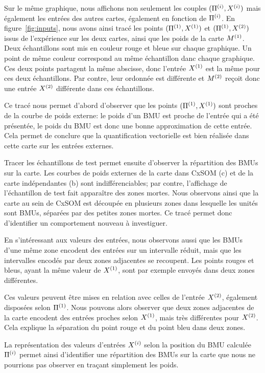 Sur le même graphique, nous affichons non seulement les couples $(\Pi^{({i})},X^{({i})})$ mais également les entrées des autres cartes, également en fonction de $\Pi^{({i})}$.
En figure~\ref{fig:inputs}, nous avons ainsi tracé les points $(\Pi^{({1})},X^{({1})})$ et $(\Pi^{({1})},X^{({2})})$ issus de l'expérience sur les deux cartes, ainsi que les poids de la carte $M^{({1})}$.
Deux échantillons sont mis en couleur rouge et bleue sur chaque graphique. Un point de même couleur correspond au même échantillon danc chaque graphique. Ces deux points partagent la même abscisse, donc l'entrée $X^{({1})}$ est la même pour ces deux échantillons. Par contre, leur ordonnée est différente et $M^{({2})}$ reçoit donc une entrée $X^{({2})}$ différente dans ces échantillons.

Ce tracé nous permet d'abord d'observer que les points $(\Pi^{({1})},X^{({1})})$ sont proches de la courbe de poids externe: le poids d'un BMU est proche de l'entrée qui a été présentée, le poids du BMU est donc une bonne approximation de cette entrée. Cela permet de conclure que la quantification vectorielle est bien réalisée dans cette carte sur les entrées externes.

Tracer les échantillons de test permet ensuite d'observer la répartition des BMUs sur la carte. Les courbes de poids externes de la carte dans CxSOM (c) et de la carte indépendantes (b) sont indifférenciables; par contre, l'affichage de l'échantillon de test fait apparaître des zones mortes. Nous observons ainsi que la carte au sein de CxSOM est découpée en plusieurs zones dans lesquelle les unités sont BMUs, séparées par des petites zones mortes. Ce tracé permet donc d'identifier un comportement nouveau à investiguer.


En s'intéressant aux valeurs des entrées, nous observons aussi que les BMUs d'une même zone encodent des entrées sur un intervalle réduit, mais que les intervalles encodés par deux zones adjacentes se recoupent. Les points rouges et bleus, ayant la même valeur de $X^{({1})}$, sont par exemple envoyés dans deux zones différentes.

Ces valeurs peuvent être mises en relation avec celles de l'entrée $X^{({2})}$, également disposées selon $\Pi^{({1})}$. Nous pouvons alors observer que deux zones adjacentes de la carte encodent des entrées proches selon $X^{({1})}$, mais très différentes pour $X^{({2})}$. Cela explique la séparation du point rouge et du point bleu dans deux zones.

La représentation des valeurs d'entrées $X^{({i})}$ selon la position du BMU calculée $\Pi^{({i})}$ permet ainsi d'identifier une répartition des BMUs sur la carte que nous ne pourrions pas observer en traçant simplement les poids.

